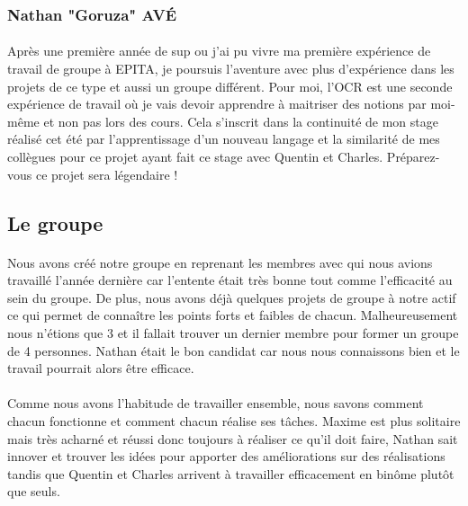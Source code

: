 \documentclass{article}
\begin{document}
\subsubsection{Nathan "Goruza" AVÉ}
\paragraph{}Après une première année de sup ou j’ai pu vivre ma première expérience de travail de groupe à EPITA, je poursuis l’aventure avec plus d’expérience dans les projets de ce type et aussi un groupe différent. Pour moi, l’OCR est une seconde expérience de travail où je vais devoir apprendre à maitriser des notions par moi-même et non pas lors des cours. Cela s’inscrit dans la continuité de mon stage réalisé cet été par l’apprentissage d’un nouveau langage et la similarité de mes collègues pour ce projet ayant fait ce stage avec Quentin et Charles. Préparez-vous ce projet sera légendaire !


\newpage


\subsection{Le groupe}

\paragraph{}Nous avons créé notre groupe en reprenant les membres avec qui nous avions travaillé l'année dernière car l'entente était très bonne tout comme l'efficacité au sein du groupe. De plus, nous avons déjà quelques projets de groupe à notre actif ce qui permet de connaître les points forts et faibles de chacun. Malheureusement nous n'étions que 3 et il fallait trouver un dernier membre pour former un groupe de 4 personnes. Nathan était le bon candidat car nous nous connaissons bien et le travail pourrait alors être efficace.

\paragraph{}Comme nous avons l'habitude de travailler ensemble, nous savons comment chacun fonctionne et comment chacun réalise ses tâches. Maxime est plus solitaire mais très acharné et réussi donc toujours à réaliser ce qu'il doit faire, Nathan sait innover et trouver les idées pour apporter des améliorations sur des réalisations tandis que Quentin et Charles arrivent à travailler efficacement en binôme plutôt que seuls.
\end{document}
